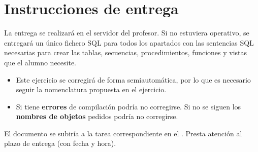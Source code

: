 \section{Instrucciones de entrega}
La entrega se realizará en el servidor del profesor. Si no estuviera operativo, se entregará un único fichero SQL para todos los apartados con las sentencias SQL necesarias para crear las tablas, secuencias, procedimientos, funciones y vistas que el alumno necesite.
\begin{itemize}
\item Este ejercicio se corregirá de forma semiautomática, por lo que es necesario seguir la nomenclatura propuesta en el ejercicio.
\item Si tiene \textbf{errores} de compilación podría no corregirse. Si no se siguen los \textbf{nombres de objetos} pedidos podría no corregirse.
\end{itemize}


El documento se subiría a la tarea correspondiente en el .
Presta atención al plazo de entrega (con fecha y hora).







